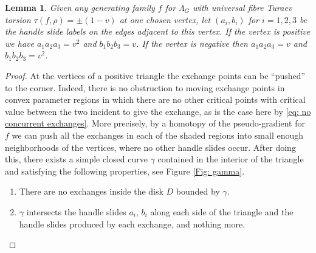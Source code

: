 \documentclass[11pt]{article}
\numberwithin{equation}{section}\providecommand{\dpl}{\displaystyle}
\newenvironment{enumeratea}
{\bgroup\def\theenumi{\alph{enumi}}\begin{enumerate}}
{\end{enumerate}\egroup}
\theoremstyle{plain}
\newtheorem{lemma}[theorem]{Lemma}
\theoremstyle{definition}
\begin{document}
\begin{lemma}\label{a3=v2 and b3=v}
Given any generating family $f$ for $\Lambda_G$ with universal fibre Turaev torsion $\tau(f,\rho)=\pm(1-v)$ at one chosen vertex, let $(a_i,b_i)$ for $i=1,2,3$ be the handle slide labels on the edges adjacent to this vertex. If the vertex is positive we have $a_1a_2a_3=v^2$ and $b_1b_2b_3=v$. If the vertex is negative then $a_1a_2a_3=v$ and $b_1b_2b_3=v^2$.
\end{lemma}

\begin{proof}
At the vertices of a positive triangle the exchange points can be ``pushed'' to the corner. Indeed, there is no obstruction to moving exchange points in convex parameter regions in which there are no other critical points with critical value between the two incident to give the exchange, as is the case here by \eqref{eq: no concurrent exchanges}. More precisely, by a homotopy of the pseudo-gradient for $f$ we can push all the exchanges in each of the shaded regions into small enough neighborhoods of the vertices, where no other handle slides occur. After doing this, there exists a simple closed curve $\gamma$ contained in the interior of the triangle and satisfying the following properties, see Figure \ref{Fig: gamma}.
\begin{enumeratea}
\item\label{enum:a}
There are no exchanges inside the disk $D$ bounded by $\gamma$.
\item\label{enum:b}
$\gamma$ intersects the handle slides $a_i$, $b_i$ along each side of the triangle and the handle slides produced by each exchange, and nothing more.
\end{enumeratea}

\begin{figure}[htbp]
\begin{center}
\end{center}
\end{figure}
\end{proof}
\end{document}
